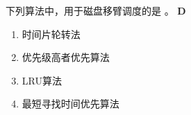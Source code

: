 \begin{problem}
	下列算法中，用于磁盘移臂调度的是 \myline。
	\textbf{D}
	\vspace{-0.5em}
	\begin{multicols}{2}
		\begin{enumerate}[label=\Alph*.]
			\item 时间片轮转法
			\item 优先级高者优先算法
			\item LRU算法
			\item 最短寻找时间优先算法
		\end{enumerate}
	\end{multicols}
	\vspace{-1em}
\end{problem}
